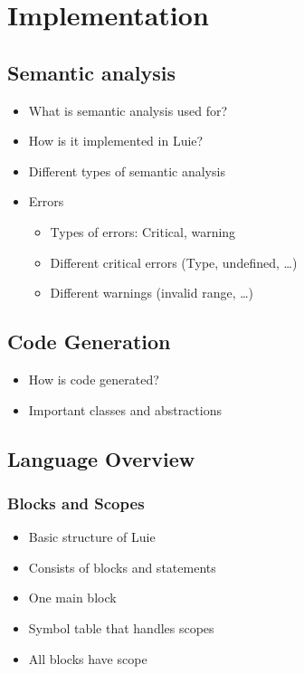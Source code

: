 \chapter{Implementation}
\label{ch:implementation}

\section{Semantic analysis}
\begin{itemize}
    \item What is semantic analysis used for?
    \item How is it implemented in Luie?
    \item Different types of semantic analysis
    \item Errors
    \begin{itemize}
        \item Types of errors: Critical, warning
        \item Different critical errors (Type, undefined, \dots)
        \item Different warnings (invalid range, \dots)
    \end{itemize}
\end{itemize}

\section{Code Generation}
\begin{itemize}
    \item How is code generated?
    \item Important classes and abstractions
\end{itemize}

\section{Language Overview}

\subsection{Blocks and Scopes}
\begin{itemize}
    \item Basic structure of Luie
    \item Consists of blocks and statements
    \item One main block
    \item Symbol table that handles scopes
    \item All blocks have scope 
\end{itemize}
